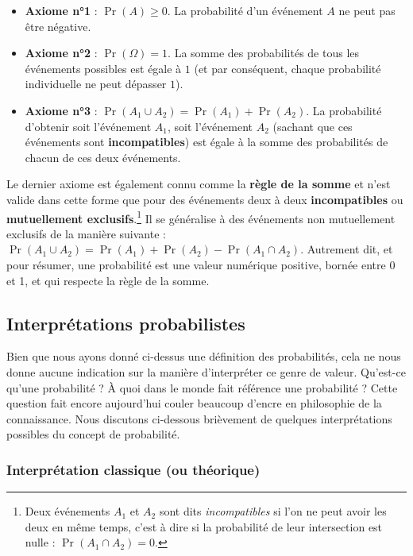 \documentclass[
  a4paper,11pt,twoside,onecolumn,openright,final,oldfontcommands]{memoir}
\theoremstyle{definition}
\theoremstyle{definition}
\theoremstyle{definition}
\theoremstyle{definition}
\theoremstyle{remark}
\begin{document}
\begin{itemize}
\item
  \textbf{Axiome n°1} : \(\Pr(A) \geq 0\). La probabilité d'un événement \(A\) ne peut pas être négative.
\item
  \textbf{Axiome n°2} : \(\Pr(\Omega) = 1\). La somme des probabilités de tous les événements possibles est égale à \(1\) (et par conséquent, chaque probabilité individuelle ne peut dépasser \(1\)).
\item
  \textbf{Axiome n°3} : \(\Pr(A_{1} \cup A_{2}) = \Pr(A_{1}) + \Pr(A_{2})\). La probabilité d'obtenir soit l'événement \(A_{1}\), soit l'événement \(A_{2}\) (sachant que ces événements sont \textbf{incompatibles}) est égale à la somme des probabilités de chacun de ces deux événements.
\end{itemize}

Le dernier axiome est également connu comme la \textbf{règle de la somme} et n'est valide dans cette forme que pour des événements deux à deux \textbf{incompatibles} ou \textbf{mutuellement exclusifs}.\footnote{Deux événements \(A_{1}\) et \(A_{2}\) sont dits \emph{incompatibles} si l'on ne peut avoir les deux en même temps, c'est à dire si la probabilité de leur intersection est nulle : \(\Pr(A_{1} \cap A_{2}) = 0\).} Il se généralise à des événements non mutuellement exclusifs de la manière suivante : \(\Pr(A_{1} \cup A_{2}) = \Pr(A_{1}) + \Pr(A_{2}) - \Pr(A_{1} \cap A_{2})\). Autrement dit, et pour résumer, une probabilité est une valeur numérique positive, bornée entre 0 et 1, et qui respecte la règle de la somme.

\hypertarget{interpruxe9tations-probabilistes}{%
\subsection{Interprétations probabilistes}\label{interpruxe9tations-probabilistes}}

Bien que nous ayons donné ci-dessus une définition des probabilités, cela ne nous donne aucune indication sur la manière d'interpréter ce genre de valeur. Qu'est-ce qu'une probabilité ? À quoi dans le monde fait référence une probabilité ? Cette question fait encore aujourd'hui couler beaucoup d'encre en philosophie de la connaissance. Nous discutons ci-dessous brièvement de quelques interprétations possibles du concept de probabilité.

\hypertarget{interpruxe9tation-classique-ou-thuxe9orique}{%
\subsubsection{Interprétation classique (ou théorique)}\label{interpruxe9tation-classique-ou-thuxe9orique}}
\end{document}
